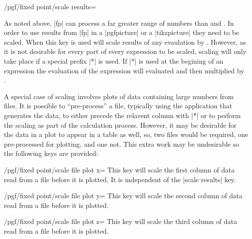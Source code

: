 \begin{key}{/pgf/fixed point/scale results=}

	As noted above, |fp| can process a far greater range of numbers
	than \pgfname{} and \tikzname{}. In order to use results from 
	|fp| in a |{pgfpicture}| or a |{tikzpicture}| they need to be
	scaled. When this key is used \pgfname{} will scale results
	of any evaulation by . However, as it is not
	desirable for every part of every expression to be scaled,
	scaling will only take place if a special prefix |*| is used.
	If |*| is used at the begining of an expression the evaluation
	of the expression will evaluated and then multiplied by 
	.

\begin{codeexample}[]	
\end{codeexample}
  
  A special case of scaling involves plots of data containing
  large numbers from files.
  It is possible to ``pre-process'' a file, typically using the 
  application that generates the data, to either precede
  the relavent column with |*| or to perform the scaling as part
  of the calculation process. However, it may be desirable for
  the data in a plot to appear in a table as well, so, two files would
  be required, one pre-processed for plotting, and one not. This
  extra work may be undesirable so the following keys are provided:
  
\begin{key}{/pgf/fixed point/scale file plot x=}
  This key will scale the first column of data read from
  a file before it is plotted. It is independent of the
  |scale results| key.
\end{key}

\begin{key}{/pgf/fixed point/scale file plot y=}
  This key will scale the second column of data read from
  a file before it is plotted. 
\end{key}

\begin{key}{/pgf/fixed point/scale file plot z=}
  This key will scale the third column of data read from
  a file before it is plotted. 
\end{key}

\end{key} 

